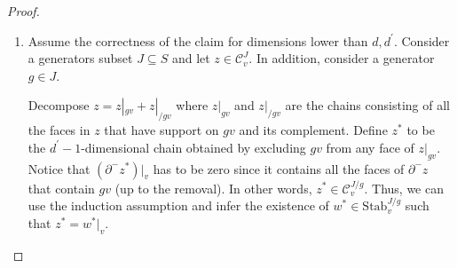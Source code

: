 \begin{proof}
\begin{enumerate}
    \item Assume the correctness of the claim for dimensions lower than $d, d^{\prime}$. Consider a generators subset $J \subseteq S$ and let $z \in \mathcal{C}_{v}^{J}$. In addition, consider a generator $g \in J$.
      
      Decompose $z = z|_{gv} + z|_{/gv}$ where $z|_{gv}$ and $z|_{/gv}$ are the chains consisting of all the faces in $z$ that have support on $gv$ and its complement. Define $z^{*}$ to be the $d^{\prime}-1$-dimensional chain obtained by excluding $gv$ from any face of $z|_{gv}$. Notice that $(\partial^{-} z^{*})|_{v}$ has to be zero since it contains all the faces of $\partial^{-}z$ that contain $gv$ (up to the removal). In other words, $z^{*} \in \mathcal{C}_{v}^{J/g}$. Thus, we can use the induction assumption and infer the existence of $w^{*} \in \text{Stab}_{v}^{J/g}$ such that $z^{*} = w^{*}|_{v}$.


\end{enumerate}
\end{proof}
